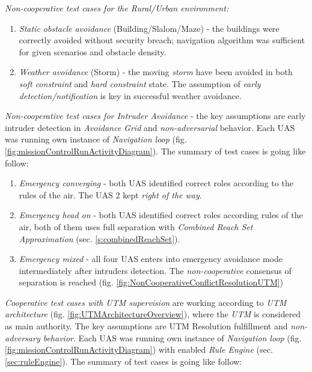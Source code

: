 \noindent\emph{Non-cooperative test cases for the Rural/Urban environment:}
\begin{enumerate}
    \item\emph{Static obstacle avoidance} (Building/Slalom/Maze) - the buildings were correctly avoided without security breach; navigation algorithm was sufficient for given scenarios and obstacle density.
    
    \item\emph{Weather avoidance} (Storm) - the moving \emph{storm} have been avoided in both \emph{soft constraint} and \emph{hard constraint} state. The assumption of \emph{early detection/notification} is key in successful weather avoidance.
\end{enumerate}

\noindent\emph{Non-cooperative test cases for Intruder Avoidance} - the key assumptions are early intruder detection in \emph{Avoidance Grid} and \emph{non-adversarial} behavior. Each UAS was running own instance of \emph{Navigation loop} (fig. \ref{fig:missionControlRunActivityDiagram}). The summary of test cases is going like follow:

\begin{enumerate}
    \item\emph{Emergency converging} - both UAS identified correct roles according to the rules of the air. The UAS 2 kept \emph{right of the way}.
    
    \item\emph{Emergency head on} - both UAS identified correct roles according rules of the air, both of them uses full separation with \emph{Combined Reach Set Approximation} (sec. \ref{s:combinedReachSet}).
    
    \item\emph{Emergency mixed} -  all four UAS enters into emergency avoidance mode intermediately after intruders detection. The \emph{non-cooperative} consensus of separation is reached (fig. \ref{fig:NonCooperativeConflictResolutionUTM})
\end{enumerate}

\noindent\emph{Cooperative test cases with UTM supervision} are working according to \emph{UTM architecture} (fig. \ref{fig:UTMArchitectureOverview}), where the \emph{UTM} is considered as main authority. The key assumptions are UTM Resolution fulfillment and \emph{non-adversary behavior}. Each UAS was running own instance of \emph{Navigation loop} (fig. \ref{fig:missionControlRunActivityDiagram}) with enabled \emph{Rule Engine} (sec. \ref{sec:ruleEngine}). The summary of test cases is going like follow:

